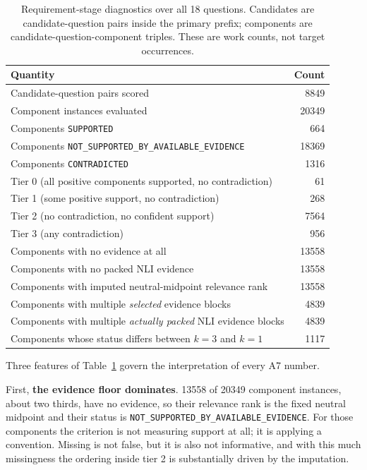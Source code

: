 \documentclass[11pt,a4paper]{article}
\begin{document}
\begin{table}[htbp]
\centering
\footnotesize
\caption{Requirement-stage diagnostics over all 18 questions. Candidates are candidate-question pairs inside the primary prefix; components are candidate-question-component triples. These are work counts, not target occurrences.}
\label{tab:reqdiag}
\begin{tabular}{@{}lr@{}}
\toprule
Quantity & Count \\
\midrule
Candidate-question pairs scored & 8849 \\
Component instances evaluated & 20349 \\
\midrule
Components \texttt{SUPPORTED} & 664 \\
Components \texttt{NOT\_SUPPORTED\_BY\_}\allowbreak\texttt{AVAILABLE\_EVIDENCE} & 18369 \\
Components \texttt{CONTRADICTED} & 1316 \\
\midrule
Tier 0 (all positive components supported, no contradiction) & 61 \\
Tier 1 (some positive support, no contradiction) & 268 \\
Tier 2 (no contradiction, no confident support) & 7564 \\
Tier 3 (any contradiction) & 956 \\
\midrule
Components with no evidence at all & 13558 \\
Components with no packed NLI evidence & 13558 \\
Components with imputed neutral-midpoint relevance rank & 13558 \\
Components with multiple \emph{selected} evidence blocks & 4839 \\
Components with multiple \emph{actually packed} NLI evidence blocks & 4839 \\
Components whose status differs between $k=3$ and $k=1$ & 1117 \\
\bottomrule
\end{tabular}
\end{table}

Three features of Table~\ref{tab:reqdiag} govern the interpretation of every A7 number.

First, \textbf{the evidence floor dominates}. 13558 of 20349 component instances, about two thirds, have no evidence, so their relevance rank is the fixed neutral midpoint and their status is \texttt{NOT\_SUPPORTED\_BY\_}\allowbreak\texttt{AVAILABLE\_EVIDENCE}. For those components the criterion is not measuring support at all; it is applying a convention. Missing is not false, but it is also not informative, and with this much missingness the ordering inside tier 2 is substantially driven by the imputation.
\end{document}
